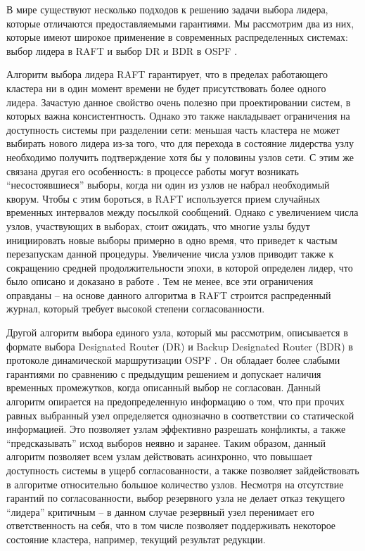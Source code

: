 \documentclass{article}
\theoremstyle{plain}
\theoremstyle{plain}
\theoremstyle{plain}
\theoremstyle{plain}
\theoremstyle{definition}
\theoremstyle{remark}
\theoremstyle{plain}
\begin{document}
В мире существуют несколько подходов к решению задачи выбора лидера, которые отличаются предоставляемыми гарантиями. Мы рассмотрим два из них, которые имеют широкое применение в современных распределенных системах: выбор лидера в RAFT \cite{RAFT} и выбор DR и BDR в OSPF  \cite[стр.~75]{RFC2328}.

Алгоритм выбора лидера RAFT гарантирует, что в пределах работающего кластера ни в один момент времени не будет присутствовать более одного лидера. Зачастую данное свойство очень полезно при проектировании систем, в которых важна консистентность. Однако это также накладывает ограничения на доступность системы при разделении сети: меньшая часть кластера не может выбирать нового лидера из-за того, что для перехода в состояние лидерства узлу необходимо получить подтверждение хотя бы у половины узлов сети. С этим же связана другая его особенность: в процессе работы могут возникать \enquote{несостоявшиеся} выборы, когда ни один из узлов не набрал необходимый кворум. Чтобы с этим бороться, в RAFT используется прием случайных временных интервалов между посылкой сообщений. Однако с увеличением числа узлов, участвующих в выборах, стоит ожидать, что многие узлы будут инициировать новые выборы примерно в одно время, что приведет к частым перезапускам данной процедуры. Увеличение числа узлов приводит также к сокращению средней продолжительности эпохи, в которой определен лидер, что было описано и доказано в работе \cite{RAFT_performance_1808.01081}. Тем не менее, все эти ограничения оправданы -- на основе данного алгоритма в RAFT строится распреденный журнал, который требует высокой степени согласованности.

Другой алгоритм выбора единого узла, который мы рассмотрим, описывается в формате выбора Designated Router (DR) и Backup Designated Router (BDR) в протоколе динамической маршрутизации OSPF \cite[стр.~75]{RFC2328}. Он обладает более слабыми гарантиями по сравнению с предыдущим решением и допускает наличия временных промежутков, когда описанный выбор не согласован. Данный алгоритм опирается на предопределенную информацию о том, что при прочих равных выбранный узел определяется однозначно в соответствии со статической информацией. Это позволяет узлам эффективно разрешать конфликты, а также \enquote{предсказывать} исход выборов неявно и заранее. Таким образом, данный алгоритм позволяет всем узлам действовать асинхронно, что повышает доступность системы в ущерб согласованности, а также позволяет зайдействовать в алгоритме относительно большое количество узлов. Несмотря на отсутствие гарантий по согласованности, выбор резервного узла не делает отказ текущего \enquote{лидера} критичным -- в данном случае резервный узел перенимает его ответственность на себя, что в том числе позволяет поддерживать некоторое состояние кластера, например, текущий результат редукции.
\end{document}
